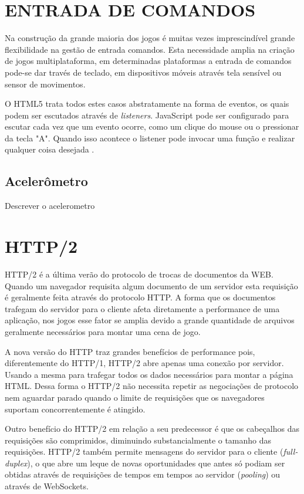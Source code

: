 \section{ENTRADA DE COMANDOS}
\begin{draft}
Na construção da grande maioria dos jogos é muitas vezes
imprescindível grande flexibilidade na gestão de entrada comandos.
Esta necessidade amplia na criação de jogos multiplataforma, em
determinadas plataformas a entrada de comandos pode-se dar través de
teclado, em dispositivos móveis através tela sensível ou sensor de
movimentos.

O HTML5 trata todos estes casos abstratamente na forma de eventos, os
quais podem ser escutados através de \textit{listeners}. JavaScript
pode ser configurado para escutar cada vez que um evento ocorre, como
um clique do mouse ou o pressionar da tecla "A". Quando isso acontece o
listener pode invocar uma função e realizar qualquer coisa desejada
\autocite{buildingHtml5Game}.


\end{draft}
\subsection{Acelerômetro}
\begin{draft}
    Descrever o acelerometro
\end{draft}
\section{HTTP/2}
HTTP/2 é a última verão do protocolo de trocas de documentos da
WEB. Quando um navegador requisita algum documento de um servidor esta
requisição é geralmente feita através do protocolo HTTP. A forma
que os documentos trafegam do servidor para o cliente afeta diretamente
a performance de uma aplicação, nos jogos esse fator se amplia devido
a grande quantidade de arquivos geralmente necessários para montar uma
cena de jogo.

A nova versão do HTTP traz grandes benefícios de performance
pois, diferentemente do HTTP/1, HTTP/2 abre apenas uma conexão por
servidor. Usando a mesma para trafegar todos os dados necessários para
montar a página HTML. Dessa forma o HTTP/2 não necessita repetir
as negociações de protocolo nem aguardar parado quando o limite de
requisições que os navegadores suportam concorrentemente é atingido.

Outro benefício do HTTP/2 em relação a seu predecessor é que
os cabeçalhos das requisições são comprimidos, diminuindo
substancialmente o tamanho das requisições. HTTP/2 também permite
mensagens do servidor para o cliente (\textit{full-duplex}), o
que abre um leque de novas oportunidades que antes só podiam ser
obtidas através de requisições de tempos em tempos ao servidor
(\textit{pooling}) ou através de WebSockets.

